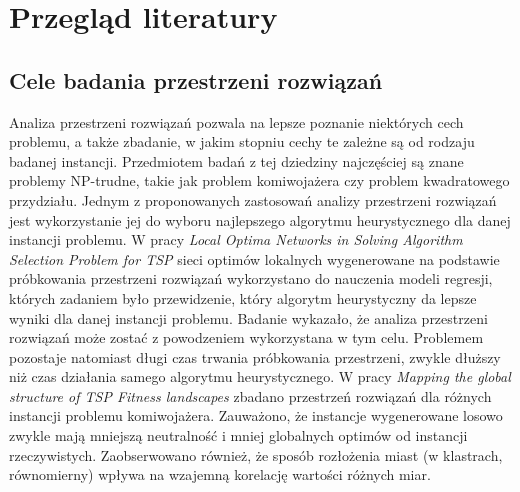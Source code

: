 \chapter{Przegląd literatury}

\section{Cele badania przestrzeni rozwiązań}
Analiza przestrzeni rozwiązań pozwala na lepsze poznanie niektórych cech problemu, a także zbadanie, w jakim stopniu cechy te zależne są od
rodzaju badanej instancji. Przedmiotem badań z tej dziedziny najczęściej są znane problemy NP-trudne, takie jak problem komiwojażera czy problem kwadratowego przydziału.
Jednym z proponowanych zastosowań analizy przestrzeni rozwiązań jest wykorzystanie jej do wyboru najlepszego algorytmu heurystycznego
dla danej instancji problemu. W pracy \textit{Local Optima Networks in Solving Algorithm Selection Problem for TSP}\cite{DBLP:conf/depcos/BozejkoGNAB18}
sieci optimów lokalnych wygenerowane na podstawie próbkowania przestrzeni rozwiązań wykorzystano do nauczenia modeli regresji, których zadaniem było
przewidzenie, który algorytm heurystyczny da lepsze wyniki dla danej instancji problemu.
Badanie wykazało, że analiza przestrzeni rozwiązań może zostać z powodzeniem wykorzystana w tym celu.
Problemem pozostaje natomiast długi czas trwania próbkowania przestrzeni, zwykle dłuższy niż czas działania samego algorytmu heurystycznego.
W pracy \textit{Mapping the global structure of TSP Fitness landscapes}\cite{DBLP:journals/heuristics/OchoaV18} zbadano przestrzeń rozwiązań
dla różnych instancji problemu komiwojażera. Zauważono, że instancje wygenerowane losowo zwykle mają mniejszą neutralność i mniej globalnych optimów od
instancji rzeczywistych. Zaobserwowano również, że sposób rozłożenia miast (w klastrach, równomierny) wpływa na wzajemną korelację wartości różnych miar.

